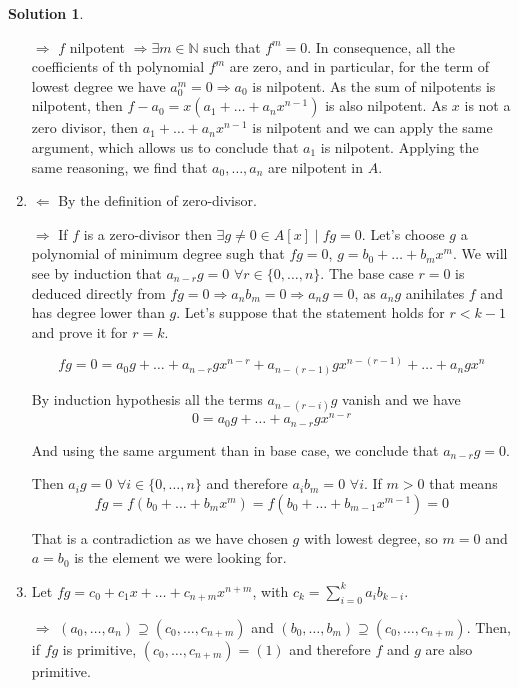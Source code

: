 \documentclass[12pt]{article}
\newcommand{\N}{\ensuremath{\mathbb{N}}}
\newcommand{\imp}{\ensuremath{\Rightarrow}}
\theoremstyle{definition}
\newtheorem*{sol}{Solution}
\begin{document}
\begin{sol}
\begin{enumerate}[label=(\roman*)]
	$\boxed{\Rightarrow}$ $f$ nilpotent $\imp \exists m \in \N$ such that $f^m = 0$. In consequence, all the coefficients of th polynomial $f^m$ are zero, and in particular, for the term of lowest degree we have $a_0^m = 0 \imp a_0$ is nilpotent. As the sum of nilpotents is nilpotent, then $f-a_0 = x(a_1 + \dots + a_n x^{n-1})$ is also nilpotent. As $x$ is not a zero divisor, then $a_1 + \dots + a_n x^{n-1}$ is nilpotent and we can apply the same argument, which allows us to conclude that $a_1$ is nilpotent. Applying the same reasoning, we find that $a_0, \dots, a_n$ are nilpotent in $A$.
	
	\item $\boxed{\Leftarrow}$ By the definition of zero-divisor.

	$\boxed{\Rightarrow}$ If $f$ is a zero-divisor then $\exists g \neq 0 \in A[x] \mid fg = 0$. Let's choose $g$ a polynomial of minimum degree sugh that $fg = 0$, $g = b_0 + \dots + b_m x^m$. We will see by induction that $a_{n-r} g = 0 \, \, \forall r \in \{0, \dots, n\}$. The base case $r = 0$ is deduced directly from $fg = 0 \imp a_n b_m = 0 \imp a_n g = 0$, as $a_n g$ anihilates $f$ and has degree lower than $g$. Let's suppose that the statement holds for $r < k-1$ and prove it for $r = k$. 

	\[
		fg = 0 = a_0 g + \dots + a_{n-r}g x^{n-r} + a_{n-(r-1)}g x^{n-(r-1)} + \dots + a_n g x^n
	\]

	By induction hypothesis all the terms $a_{n-(r-i)}g$ vanish and we have 
	\[
		0 = a_0 g + \dots + a_{n-r}g x^{n-r}
	\]

	And using the same argument than in base case, we conclude that $a_{n-r}g = 0$.

	Then $a_i g = 0 \, \, \forall i \in \{0 , \dots , n\}$ and therefore $a_i b_m = 0 \, \, \forall i$. If $m > 0$ that means 
	\[
		fg = f(b_0 + \dots + b_m x^m) = f(b_0 + \dots + b_{m-1} x^{m-1}) = 0
	\]

	That is a contradiction as we have chosen $g$ with lowest degree, so $m = 0$ and $a = b_0$ is the element we were looking for.


	\item Let $fg = c_0 + c_1 x + \dots + c_{n+m}x^{n+m}$, with $c_k = \sum_{i = 0}^k a_i b_{k-i}$.

	$\boxed{\Rightarrow}$ $(a_0, \dots, a_n) \supseteq (c_0, \dots, c_{n+m})$ and $(b_0, \dots, b_m) \supseteq (c_0, \dots, c_{n+m})$. Then, if $fg$ is primitive, $(c_0, \dots, c_{n+m}) = (1)$ and therefore $f$ and $g$ are also primitive.


\end{enumerate}
\end{sol}
\end{document}
